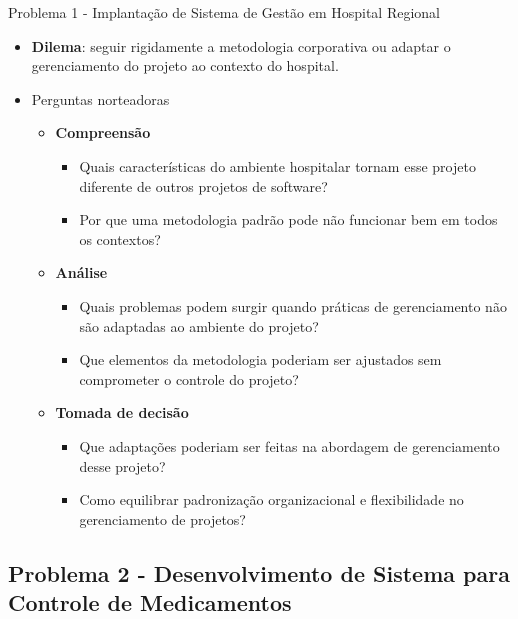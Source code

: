 \documentclass{beamer}
\begin{document}
\begin{frame}{Problema 1 - Implantação de Sistema de Gestão em Hospital Regional}
	\begin{itemize}
		\justifying
		\small
		\item \textbf{Dilema}: seguir rigidamente a metodologia corporativa ou adaptar o gerenciamento do projeto ao contexto do hospital.
		\item Perguntas norteadoras
			\begin{itemize}
				\justifying
				\footnotesize
				\item \textbf{Compreensão}
					\begin{itemize}
						\justifying
						\scriptsize
						\item Quais características do ambiente hospitalar tornam esse projeto diferente de outros projetos de software?
						\item Por que uma metodologia padrão pode não funcionar bem em todos os contextos?
					\end{itemize}
				\item \textbf{Análise}
					\begin{itemize}
						\justifying
						\scriptsize
						\item Quais problemas podem surgir quando práticas de gerenciamento não são adaptadas ao ambiente do projeto?
						\item Que elementos da metodologia poderiam ser ajustados sem comprometer o controle do projeto?
					\end{itemize}
				\item \textbf{Tomada de decisão}
					\begin{itemize}
						\justifying
						\scriptsize
						\item Que adaptações poderiam ser feitas na abordagem de gerenciamento desse projeto?
						\item Como equilibrar padronização organizacional e flexibilidade no gerenciamento de projetos?
					\end{itemize}
			\end{itemize}
	\end{itemize}
\end{frame}

\subsection{Problema 2 - Desenvolvimento de Sistema para Controle de Medicamentos}
\end{document}
